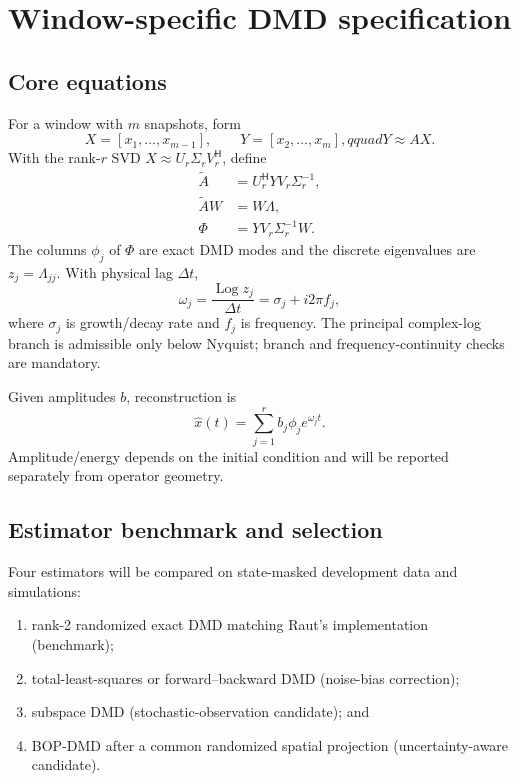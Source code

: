 \documentclass[11pt,a4paper]{article}
\newcommand{\Hh}{^{\mathsf H}}
\DeclareMathOperator{\Log}{Log}
\begin{document}
\section{Window-specific DMD specification}

\subsection{Core equations}

For a window with $m$ snapshots, form
\begin{equation}
  X=[x_1,\ldots,x_{m-1}],\qquad
  Y=[x_2,\ldots,x_m],qquad Y\approx AX.
\end{equation}
With the rank-$r$ SVD $X\approx U_r\Sigma_rV_r\Hh$, define
\begin{align}
  \widetilde A &= U_r\Hh YV_r\Sigma_r^{-1},\\
  \widetilde A W &= W\Lambda,\\
  \Phi &= YV_r\Sigma_r^{-1}W.
\end{align}
The columns $\phi_j$ of $\Phi$ are exact DMD modes and the discrete eigenvalues are $z_j=\Lambda_{jj}$. With physical lag $\Delta t$,
\begin{equation}
  \omega_j=\frac{\Log z_j}{\Delta t}=\sigma_j+i2\pi f_j,
\end{equation}
where $\sigma_j$ is growth/decay rate and $f_j$ is frequency. The principal complex-log branch is admissible only below Nyquist; branch and frequency-continuity checks are mandatory.

Given amplitudes $b$, reconstruction is
\begin{equation}
  \widehat x(t)=\sum_{j=1}^{r} b_j\phi_j e^{\omega_j t}.
\end{equation}
Amplitude/energy depends on the initial condition and will be reported separately from operator geometry.

\subsection{Estimator benchmark and selection}

Four estimators will be compared on state-masked development data and simulations:

\begin{enumerate}
  \item rank-2 randomized exact DMD matching Raut's implementation (benchmark);
  \item total-least-squares or forward--backward DMD (noise-bias correction);
  \item subspace DMD (stochastic-observation candidate); and
  \item BOP-DMD after a common randomized spatial projection (uncertainty-aware candidate).
\end{enumerate}
\end{document}
